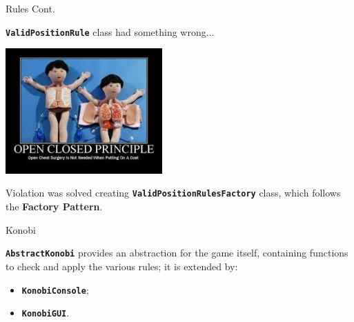 \documentclass{beamer}
\begin{document}
  \begin{frame} {Rules Cont.}

    \textbf{\texttt{ValidPositionRule}} class had something wrong...

    \vspace{1em}


    \pause
    \hfill
    \includegraphics[width=0.45\textwidth]{img/openclosedprinciple.jpeg}

    \pause

    \vspace{1em}

    Violation was solved creating \textbf{\texttt{ValidPositionRulesFactory}} class, which follows the \textbf{Factory Pattern}.

  \end{frame}


  \begin{frame} {Konobi}

    \texttt{\textbf{AbstractKonobi}} provides an abstraction for the game itself, containing functions to check and apply the various rules; it is extended by:

    \vspace{1em}

    \begin{itemize}
      \item \textbf{\texttt{KonobiConsole}};
      \item \textbf{\texttt{KonobiGUI}}.
    \end{itemize}


  \end{frame}
\end{document}
